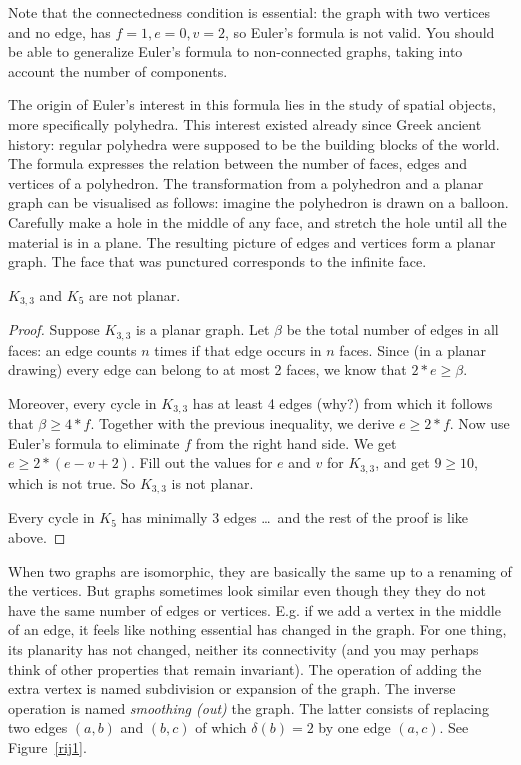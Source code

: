 Note that the connectedness condition is essential: the graph with two
vertices and no edge, has $f = 1, e = 0, v = 2$, so Euler's formula is
not valid. You should be able to generalize Euler's formula to
non-connected graphs, taking into account the number of components.

The origin of Euler's interest in this formula lies in the study of
spatial objects, more specifically polyhedra. This interest
existed already since Greek ancient history: regular polyhedra were
supposed to be the building blocks of the world. The formula expresses
the relation between the number of faces, edges and vertices of a
polyhedron. The transformation from a polyhedron and a planar graph
can be visualised as follows: imagine the polyhedron is drawn on a
balloon. Carefully make a hole in the middle of any face, and stretch
the hole until all the material is in a plane. The resulting picture
of edges and vertices form a planar graph. The face that was punctured
corresponds to the infinite face.

 \begin{theorem}
$K_{3,3}$ and $K_{5}$ are not planar.
\end{theorem}
\begin{proof}
Suppose $K_{3,3}$ is a planar graph. Let $\beta$ be the total number
of edges in all faces: an edge counts $n$ times if that edge occurs in
$n$ faces. Since (in a planar drawing) every edge can belong to at most 2
faces, we know that $2*e \geq \beta$.

Moreover, every cycle in $K_{3,3}$ has at least 4 edges (why?) from
which it follows that $\beta \geq 4*f$. Together with the previous
inequality, we derive $e \geq 2*f$. Now use Euler's formula to
eliminate $f$ from the right hand side. We get $e \geq 2*(e-v+2)$.
Fill out the values for $e$ and $v$ for $K_{3,3}$, and get $9 \geq
10$, which is not true. So $K_{3,3}$ is not planar.

Every cycle in $K_{5}$ has minimally 3 edges \ldots\ and the rest of
the proof is like above.
\end{proof}


When two graphs are isomorphic, they are basically the same up to a
renaming of the vertices. But graphs sometimes look similar even
though they they do not have the same number of edges or
vertices. E.g. if we add a vertex in the middle of an edge, it feels
like nothing essential has changed in the graph. For one thing, its
planarity has not changed, neither its connectivity (and you may
perhaps think of other properties that remain invariant). The
operation of adding the extra vertex is named subdivision or expansion
of the graph. The inverse operation is named {\em smoothing (out)} the
graph. The latter consists of replacing two edges $(a,b)$ and $(b,c)$
of which $\delta(b) = 2$ by one edge $(a,c)$. See Figure~\ref{rij1}.



